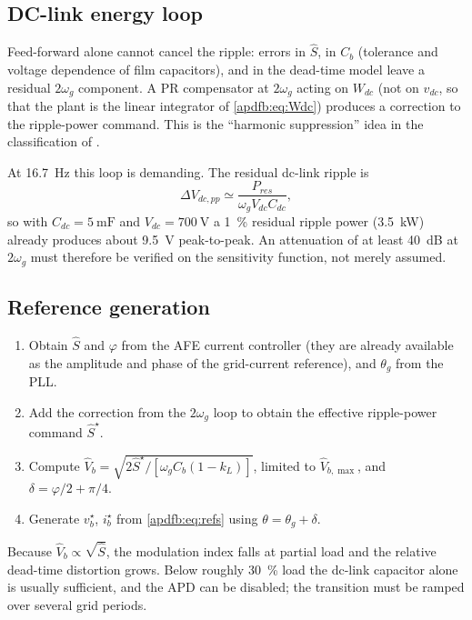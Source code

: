 \subsection{DC-link energy loop}

Feed-forward alone cannot cancel the ripple: errors in $\hat S$, in $C_b$
(tolerance and voltage dependence of film capacitors), and in the dead-time
model leave a residual $2\omega_g$ component. A PR compensator at $2\omega_g$
acting on $W_{dc}$ (not on $v_{dc}$, so that the plant is the linear integrator
of \eqref{apdfb:eq:Wdc}) produces a correction to the ripple-power command. This is
the ``harmonic suppression'' idea in the classification of
\cite{liu2021review}.

At \SI{16.7}{\hertz} this loop is demanding. The residual dc-link ripple is
\begin{equation}
\Delta V_{dc,pp} \simeq \frac{P_{res}}{\omega_g V_{dc} C_{dc}} ,
\end{equation}
so with $C_{dc}=\SI{5}{\milli\farad}$ and $V_{dc}=\SI{700}{\volt}$ a
\SI{1}{\percent} residual ripple power (\SI{3.5}{\kilo\watt}) already produces
about \SI{9.5}{\volt} peak-to-peak. An attenuation of at least
\SI{40}{\deci\bel} at $2\omega_g$ must therefore be verified on the sensitivity
function, not merely assumed.

\subsection{Reference generation}

\begin{enumerate}
\item Obtain $\hat S$ and $\varphi$ from the AFE current controller (they are
already available as the amplitude and phase of the grid-current reference), and
$\theta_g$ from the PLL.
\item Add the correction from the $2\omega_g$ loop to obtain the effective
ripple-power command $\hat S^\star$.
\item Compute $\hat V_b = \sqrt{2\hat S^\star / [\omega_g C_b(1-k_L)]}$, limited
to $\hat V_{b,\max}$, and $\delta = \varphi/2 + \pi/4$.
\item Generate $v_b^\star$, $i_b^\star$ from \eqref{apdfb:eq:refs} using
$\theta = \theta_g + \delta$.
\end{enumerate}

Because $\hat V_b \propto \sqrt{\hat S}$, the modulation index falls at partial
load and the relative dead-time distortion grows. Below roughly \SI{30}{\percent}
load the dc-link capacitor alone is usually sufficient, and the APD can be
disabled; the transition must be ramped over several grid periods.


